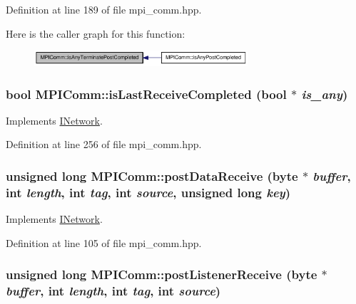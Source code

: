 Definition at line 189 of file mpi\_\-comm.hpp.

Here is the caller graph for this function:\nopagebreak
\begin{figure}[H]
\begin{center}
\leavevmode
\includegraphics[width=224pt]{class_m_p_i_comm_a0e84bad56ed23e721626ac1273a90670_icgraph}
\end{center}
\end{figure}
\hypertarget{class_m_p_i_comm_a26ebe2409a5fea582918a00896c067e9}{
\subsubsection[{isLastReceiveCompleted}]{\setlength{\rightskip}{0pt plus 5cm}bool MPIComm::isLastReceiveCompleted (bool $\ast$ {\em is\_\-any})}}
\label{class_m_p_i_comm_a26ebe2409a5fea582918a00896c067e9}


Implements \hyperlink{class_i_network_af6f98db34182f9ab4d705619eaabde2b}{INetwork}.

Definition at line 256 of file mpi\_\-comm.hpp.\hypertarget{class_m_p_i_comm_adac7de30f89639b574623e73c16fc0d6}{
\subsubsection[{postDataReceive}]{\setlength{\rightskip}{0pt plus 5cm}unsigned long MPIComm::postDataReceive ({\bf byte} $\ast$ {\em buffer}, \/  int {\em length}, \/  int {\em tag}, \/  int {\em source}, \/  unsigned long {\em key})}}
\label{class_m_p_i_comm_adac7de30f89639b574623e73c16fc0d6}


Implements \hyperlink{class_i_network_aa1b87ec0d7a1f6d6a2956f05afcc3c81}{INetwork}.

Definition at line 105 of file mpi\_\-comm.hpp.\hypertarget{class_m_p_i_comm_a37121a71b4636a713e4b3b0655efbc6e}{
\subsubsection[{postListenerReceive}]{\setlength{\rightskip}{0pt plus 5cm}unsigned long MPIComm::postListenerReceive ({\bf byte} $\ast$ {\em buffer}, \/  int {\em length}, \/  int {\em tag}, \/  int {\em source})}}
\label{class_m_p_i_comm_a37121a71b4636a713e4b3b0655efbc6e}



